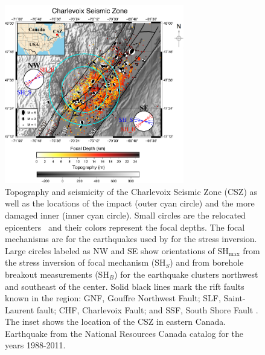 \documentclass[draft]{agujournal2018}
\begin{document}
\begin{figure}[h]
\centering
\includegraphics[width=18.5pc]{Figures/Map_of_CSZ_2.png} 
\caption{Topography and seismicity of the Charlevoix Seismic Zone (CSZ) as well as the locations of the impact  (outer cyan circle) and the more damaged inner  (inner cyan circle). Small circles  are the relocated epicenters~\citep{Powell_2017}  and their colors represent the focal depths. The focal mechanisms are for the earthquakes used by \citet{Mazzotti_2010} for the stress inversion. Large circles labeled as NW and SE show orientations of SH$_{\max}$ from the stress inversion of focal mechanism (SH$_S$) and from borehole breakout measurements (SH$_B$) for the earthquake clusters northwest and southeast of the  center. Solid black lines mark the rift faults known in the region: GNF, Gouffre Northwest Fault; SLF, Saint-Laurent fault; CHF, Charlevoix Fault; and SSF, South Shore Fault \citep{Rondot_1971,lamontagne1999}. The inset shows the location of the CSZ in eastern Canada. Earthquake  from the National Resources Canada catalog for the years 1988-2011.}
\label{figone}
\end{figure}
\end{document}
